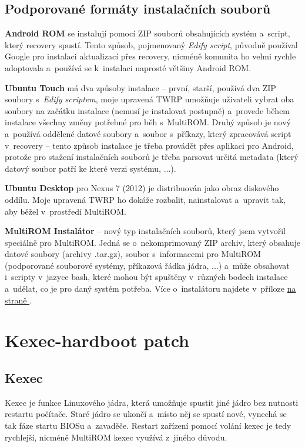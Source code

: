 \documentclass[12pt, a4paper, oneside]{article}
\newcommand{\B}{\textbf} %
\newcommand{\It}{\textit}  %
\newcommand*{\attref}[1]{\hyperref[{#1}]{\uv{\nameref*{#1}} na straně \pageref{#1}}}
\begin{document}
\subsection {Podporované formáty instalačních souborů}
\B{Android ROM} se instalují pomocí ZIP souborů obsahujících systém a~script, který recovery spustí. Tento způsob, pojmenovaný \It{Edify script}, původně používal Google pro instalaci aktualizací přes recovery, nicméně komunita ho velmi rychle adoptovala a~používá se k~instalaci naprosté většiny Android ROM.

\B{Ubuntu Touch} má dva způsoby instalace -- první, starší, používá dva ZIP soubory s~\It{Edify scriptem}, moje upravená TWRP umožňuje uživateli vybrat oba soubory na začátku instalace (nemusí je instalovat postupně) a~provede během instalace všechny změny potřebné pro běh s~MultiROM. Druhý způsob je nový a~používá oddělené datové soubory a~soubor s~příkazy, který zpracovává script v~recovery -- tento způsob instalace je třeba provádět přes aplikaci pro Android, protože pro stažení instalačních souborů je třeba parsovat určitá metadata (který datový soubor patří ke které verzi systému, ...).

\B{Ubuntu Desktop} pro Nexus 7 (2012) je distribuován jako obraz diskového oddílu. Moje upravená TWRP ho dokáže rozbalit, nainstalovat a~upravit tak, aby běžel v~prostředí MultiROM. 

\B{MultiROM Instalátor} -- nový typ instalačních souborů, který jsem vytvořil speciálně pro MultiROM. Jedná se o~nekomprimovaný ZIP archiv, který obsahuje datové soubory (archivy .tar.gz), soubor s~informacemi pro MultiROM (podporované souborové systémy, příkazová řádka jádra, ...) a~může obsahovat i~scripty v~jazyce bash, které mohou být spuštěny v~různých bodech instalace a~udělat, co je pro daný systém potřeba. Více o~instalátoru najdete v~příloze \attref{sec:installer}.

\section {Kexec-hardboot patch}
\subsection{Kexec}
Kexec je funkce Linuxového jádra, která umožňuje spustit jiné jádro bez nutnosti restartu počítače. Staré jádro se ukončí a~místo něj se spustí nové, vynechá se tak fáze startu BIOSu a~zavaděče. Restart zařízení pomocí volání kexec je tedy rychlejší, nicméně MultiROM kexec využívá z~jiného důvodu.
\end{document}
